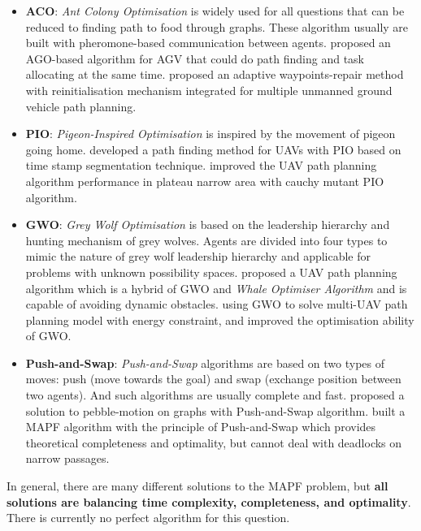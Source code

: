 \documentclass[12pt, oneside]{article}
\begin{document}
\begin{itemize}
\begin{itemize}
         \item \textbf{ACO}: \textit{Ant Colony Optimisation} is widely used for all questions that can be reduced to finding path to food through graphs. These algorithm usually are built with pheromone-based communication between agents. \cite{AGO_1} proposed an AGO-based algorithm for AGV that could do path finding and task allocating at the same time.  \cite{AGO_2} proposed an adaptive waypoints-repair method with reinitialisation mechanism integrated for multiple unmanned ground vehicle path planning.
         \item \textbf{PIO}: \textit{Pigeon-Inspired Optimisation} is inspired by the movement of pigeon going home. \cite{PIO_1} developed a path finding method for UAVs with PIO based on time stamp segmentation technique. \cite{PIO_2} improved the UAV path planning algorithm performance in plateau narrow area with cauchy mutant PIO algorithm.
         \item \textbf{GWO}: \textit{Grey Wolf Optimisation}\cite{GWO} is based on the leadership hierarchy and hunting mechanism of grey wolves. Agents are divided into four types to mimic the nature of grey wolf leadership hierarchy and applicable for problems with unknown possibility spaces.\cite{GWO_1} proposed a UAV path planning algorithm which is a hybrid of GWO and \textit{Whale Optimiser Algorithm} and is capable of avoiding dynamic obstacles. \cite{GWO_2} using GWO to solve multi-UAV path planning model with energy constraint, and improved the optimisation ability of GWO.
         \item \textbf{Push-and-Swap}: \textit{Push-and-Swap} algorithms \cite{Push_and_Swap} are based on two types of moves: push (move towards the goal) and swap (exchange position between two agents). And such algorithms are usually complete and fast. \cite{PaS_1} proposed a solution to pebble-motion on graphs with Push-and-Swap algorithm. \cite{PaS_2} built a MAPF algorithm with the principle of Push-and-Swap which provides theoretical completeness and optimality, but cannot deal with deadlocks on narrow passages.
     \end{itemize}
\end{itemize}

In general, there are many different solutions to the MAPF problem, but \textbf{all solutions are balancing time complexity, completeness, and optimality}. There is currently no perfect algorithm for this question.

\pagebreak






\end{document}
